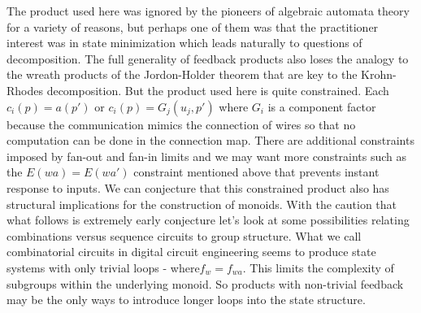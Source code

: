 \documentclass[runningheads,letter]{llncs}
\begin{document}
The product used here was ignored by the pioneers of algebraic automata theory for a variety of reasons, but
perhaps one of them was that the practitioner interest was in state minimization which leads naturally to
questions of decomposition. The full generality of feedback products also loses the analogy to the
wreath products of the Jordon-Holder theorem that are key to the Krohn-Rhodes decomposition. But
the product used here is quite constrained. Each $c_i(p)= a(p')$ or $c_i(p) = G_j(u_j,p')$ where $G_i$ is
a component factor because the 
communication mimics the connection of wires so that no computation can be done in the connection map. There
are additional constraints imposed by fan-out and fan-in limits and we may want more constraints such as
the $E(wa)=E(wa')$ constraint mentioned above that prevents instant response to inputs.
We can conjecture that this constrained
product also has structural implications for the construction of monoids. With the caution that
what follows is extremely early conjecture let's look at some possibilities relating combinations versus
sequence circuits to group structure.  What we call
combinatorial circuits in digital circuit engineering seems to produce state systems with only trivial loops - where$f_w = f_{wa}$.  This limits the complexity of subgroups within the underlying monoid. So products
with non-trivial feedback may be the only ways to introduce longer loops into the state structure.



\end{document}

